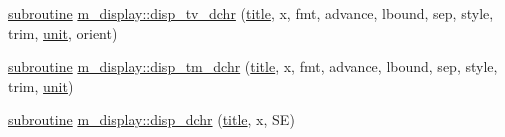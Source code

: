 \begin{DoxyCompactItemize}
\hyperlink{M__stopwatch_83_8txt_acfbcff50169d691ff02d4a123ed70482}{subroutine} \hyperlink{namespacem__display_a72a748a2cf5f7d1fd96d5634a2daa11f}{m\+\_\+display\+::disp\+\_\+tv\+\_\+dchr} (\hyperlink{print__watch_83_8txt_a15b5bd21156bb9fca6a755ab8c029a9c}{title}, x, fmt, advance, lbound, sep, style, trim, \hyperlink{M__stopwatch_83_8txt_a5cbef30eb7c0d734bd82f5a7ebea9aa7}{unit}, orient)
\item 
\hyperlink{M__stopwatch_83_8txt_acfbcff50169d691ff02d4a123ed70482}{subroutine} \hyperlink{namespacem__display_a617f15809ebffb2f8182db80523dd291}{m\+\_\+display\+::disp\+\_\+tm\+\_\+dchr} (\hyperlink{print__watch_83_8txt_a15b5bd21156bb9fca6a755ab8c029a9c}{title}, x, fmt, advance, lbound, sep, style, trim, \hyperlink{M__stopwatch_83_8txt_a5cbef30eb7c0d734bd82f5a7ebea9aa7}{unit})
\item 
\hyperlink{M__stopwatch_83_8txt_acfbcff50169d691ff02d4a123ed70482}{subroutine} \hyperlink{namespacem__display_a41b95f416778be093db3be49b2334570}{m\+\_\+display\+::disp\+\_\+dchr} (\hyperlink{print__watch_83_8txt_a15b5bd21156bb9fca6a755ab8c029a9c}{title}, x, SE)
\end{DoxyCompactItemize}
